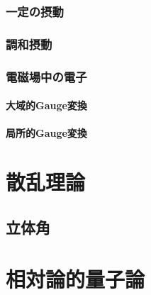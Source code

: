 \documentclass{report}
\begin{document}
      \subsection{一定の摂動}
        
      \subsection{調和摂動}
        
      \subsection{電磁場中の電子}
        
        \subsubsection{大域的Gauge変換}
          
        \subsubsection{局所的Gauge変換}
          
  \chapter{散乱理論}
    \section{立体角}
      
  \chapter{相対論的量子論}
\end{document}
